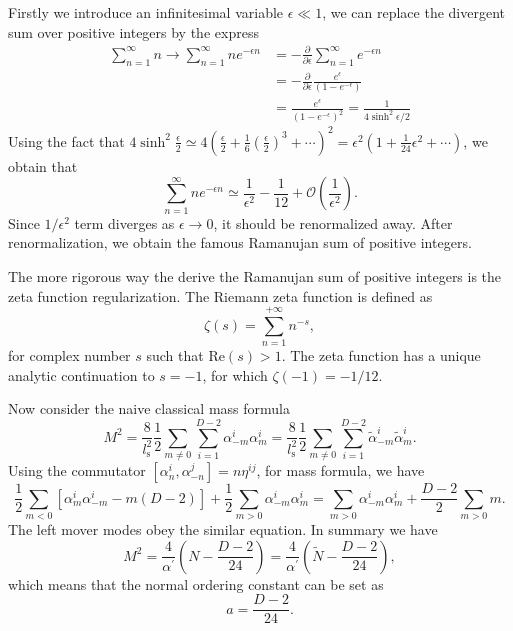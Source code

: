 \documentclass[graybox,envcountchap,sectrefs]{svmono}
\begin{document}
Firstly we introduce an infinitesimal variable $\epsilon\ll 1$, we can replace the divergent sum over positive integers by the express
\begin{equation}
\begin{aligned}
\sum_{n=1}^{\infty} n \longrightarrow \sum_{n=1}^{\infty} n e^{-\epsilon n} &=-\frac{\partial}{\partial \epsilon} \sum_{n=1}^{\infty} e^{-\epsilon n} \nonumber\\
&=-\frac{\partial}{\partial \epsilon}  \frac{e^{\epsilon}} {(1-e^{-\epsilon})}\nonumber\\
&= \frac{e^{\epsilon}} {(1-e^{-\epsilon})^2}=\frac{1}{4\sinh^2 \epsilon/2 }
\end{aligned}
\end{equation}
Using the fact that $4\sinh^2\frac{\epsilon}{2}   \simeq 4(\frac{\epsilon}{2}  +\frac{1}{6}(\frac{\epsilon}{2} )^3+\cdots)^2=\epsilon^2(1+\frac{1}{24}\epsilon^2+\cdots)$, we obtain that 
$$\sum_{n=1}^{\infty} n e^{-\epsilon n}\simeq \frac{1}{\epsilon^2} -\frac{1}{12}+\mathcal{O}( \frac{1}{\epsilon^2} ).$$
Since $1/\epsilon^2$ term diverges as $\epsilon\to 0$, it should be renormalized away. After renormalization, we obtain the famous Ramanujan sum of positive integers.

The more rigorous way the derive the Ramanujan sum of positive integers is the zeta function regularization. The Riemann zeta function is defined as 
\begin{equation}
\zeta(s)=\sum_{n=1}^{+\infty}n^{-s},
\end{equation}
for complex number $s$ such that $\mathrm{Re}( s) >1$. The zeta function has a unique analytic continuation to $s=-1$, for which $\zeta(-1)=-1/12$.

Now consider the naive classical mass formula
\begin{equation}
M^2=\frac{8}{l_{\mathrm{s}}^2}\frac{1}{2}\sum_{m\neq 0} \sum_{i=1}^{D-2} \alpha_{-m}^{i} \alpha_{m}^{i}
=\frac{8}{l_{\mathrm{s}}^2}\frac{1}{2}\sum_{m\neq 0} \sum_{i=1}^{D-2} \tilde{\alpha}_{-m}^{i} \tilde{\alpha}_{m}^{i}.
\end{equation}
Using the commutator $[\alpha_{n}^i,\alpha_{-n}^j]=n\eta^{ij}$, for mass formula, we have
\begin{equation}
\frac{1}{2} \sum_{m<0}\left[\alpha_{m}^{i} \alpha_{-m}^{i}-m(D-2)\right]+\frac{1}{2} \sum_{m>0} \alpha_{-m}^{i} \alpha_{m}^{i}=\sum_{m>0} \alpha_{-m}^{i} \alpha_{m}^{i}+\frac{D-2}{2} \sum_{m>0} m. \nonumber
\end{equation}
The left mover modes obey the similar equation. In summary we have
\begin{equation}
M^{2}=\frac{4}{\alpha^{\prime}}\left(N-\frac{D-2}{24}\right)=\frac{4}{\alpha^{\prime}}\left(\tilde{N}-\frac{D-2}{24}\right),
\end{equation}
which means that the normal ordering constant can be set as 
$$a=\frac{D-2}{24}.$$
\end{document}
